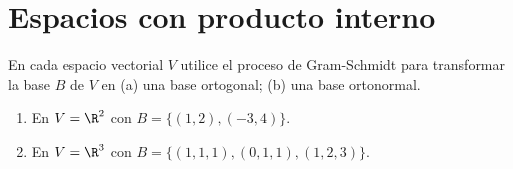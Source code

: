 \documentclass[a4,11pt]{aleph-notas}
\begin{document}
\encabezado


\section{Espacios con producto interno}

\begin{ejer}
    En cada espacio vectorial $V$ utilice el proceso de Gram-Schmidt para transformar la base $B$ de $V$ en (a) una base ortogonal; (b) una base ortonormal.
    \begin{enumerate}
        \item En $V=\R^{2}$ con $B=\{(1, 2), (-3, 4)\}$.
        \item En $V=\R^{3}$ con $B=\{(1, 1, 1), (0, 1, 1), (1, 2, 3)\}$.
    \end{enumerate}
\end{ejer}
\end{document}
